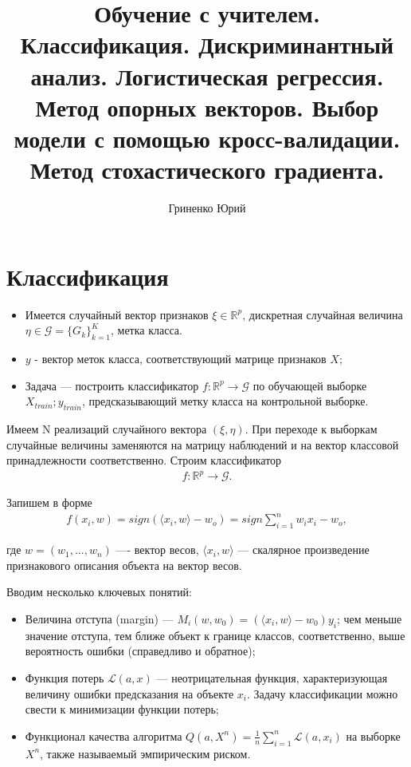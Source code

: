 \documentclass[12pt]{article}
\begin{document}
	\title{Обучение с учителем. Классификация. Дискриминантный анализ. Логистическая регрессия. Метод опорных векторов. Выбор модели с помощью кросс-валидации. Метод стохастического градиента.}
	\author{Гриненко Юрий}
	\maketitle
	
	\newpage
	\tableofcontents
	\newpage
	
	
	
	
	\section{Классификация}
	
	\begin{itemize}
	\item Имеется случайный вектор признаков $\xi \in \mathbb{R}^p$, дискретная случайная величина $\eta \in \mathcal{G} = \{G_k\}_{k = 1}^K$, метка класса.
	\item $y$ - вектор меток класса, соответствующий матрице признаков $X$;
	\item Задача --- построить классификатор $f : \mathbb{R}^p \rightarrow \mathcal{G}$ по обучающей выборке $X_{train}; y_{train}$, предсказывающий метку класса на контрольной выборке. 
	\end{itemize}
	
	Имеем N реализаций случайного вектора $(\xi, \eta)$. При переходе к выборкам случайные величины заменяются на матрицу наблюдений и на вектор классовой принадлежности соответственно. Строим классификатор
	\begin{eqnarray}\label{Base}  
		f : \mathbb{R}^p \rightarrow \mathcal{G}. 
	\end{eqnarray}
	
	Запишем в форме
	\begin{eqnarray}\label{Base_2}  
		f (x_i, w) = sign (\langle x_i, w \rangle - w_o) = sign \sum_{i=1}^{n} w_i x_i - w_o, 
	\end{eqnarray}
	
	где $w = (w_1, ..., w_n)$ ---- вектор весов, $\langle x_i, w \rangle$ --- скалярное произведение признакового описания объекта на вектор весов. 
	
	Вводим несколько ключевых понятий:
	
	\begin{itemize}
		\item Величина отступа (margin) --- $M_i (w, w_0) = (\langle x_i, w \rangle - w_0) y_i$; чем меньше значение отступа, тем ближе объект к границе классов, соответственно, выше вероятность ошибки (справедливо и обратное);
		\item Функция потерь $\mathcal{L} (a, x)$ --- неотрицательная функция, характеризующая величину ошибки предсказания на объекте $x_i$. Задачу классификации можно свести к минимизации функции потерь;
		\item Функционал качества алгоритма $Q(a, X^n) = \frac{1}{n} \sum_{i = 1}^n \mathcal{L} (a, x_i)$ на выборке $X^n$, также называемый эмпирическим риском.
	\end{itemize} 
	
\end{document}
